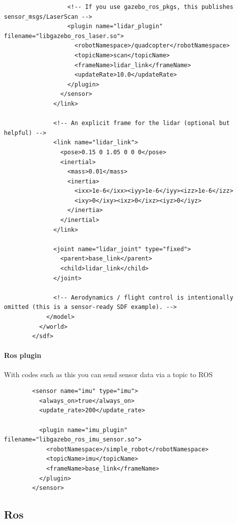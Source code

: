 \documentclass{book}
\begin{document}
\begin{verbatim}
                  <!-- If you use gazebo_ros_pkgs, this publishes sensor_msgs/LaserScan -->
                  <plugin name="lidar_plugin" filename="libgazebo_ros_laser.so">
                    <robotNamespace>/quadcopter</robotNamespace>
                    <topicName>scan</topicName>
                    <frameName>lidar_link</frameName>
                    <updateRate>10.0</updateRate>
                  </plugin>
                </sensor>
              </link>
        
              <!-- An explicit frame for the lidar (optional but helpful) -->
              <link name="lidar_link">
                <pose>0.15 0 1.05 0 0 0</pose>
                <inertial>
                  <mass>0.01</mass>
                  <inertia>
                    <ixx>1e-6</ixx><iyy>1e-6</iyy><izz>1e-6</izz>
                    <ixy>0</ixy><ixz>0</ixz><iyz>0</iyz>
                  </inertia>
                </inertial>
              </link>
        
              <joint name="lidar_joint" type="fixed">
                <parent>base_link</parent>
                <child>lidar_link</child>
              </joint>
        
              <!-- Aerodynamics / flight control is intentionally omitted (this is a sensor-ready SDF example). -->
            </model>
          </world>
        </sdf>
    \end{verbatim}

\paragraph{Ros plugin}


With codes such as this you can send sensor data via a topic to ROS
    \begin{verbatim}
        <sensor name="imu" type="imu">
          <always_on>true</always_on>
          <update_rate>200</update_rate>
        
          <plugin name="imu_plugin" filename="libgazebo_ros_imu_sensor.so">
            <robotNamespace>/simple_robot</robotNamespace>
            <topicName>imu</topicName>
            <frameName>base_link</frameName>
          </plugin>
        </sensor>
    \end{verbatim}

\subsection{Ros}
\end{document}
